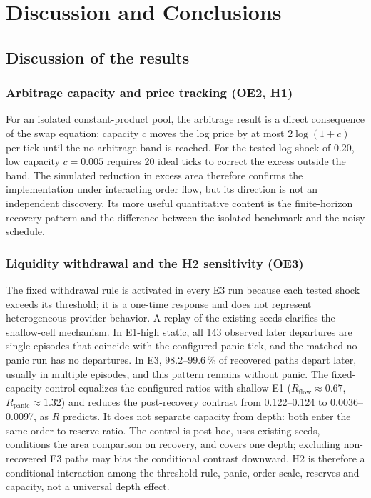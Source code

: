 \chapter{Discussion and Conclusions}
\label{cap:discusion}

\section{Discussion of the results}

\subsection{Arbitrage capacity and price tracking (OE2, H1)}

For an isolated constant-product pool, the arbitrage result is a direct consequence of the swap equation: capacity $c$ moves the log price by at most $2\log(1+c)$ per tick until the no-arbitrage band is reached. For the tested log shock of $0.20$, low capacity $c=0.005$ requires 20 ideal ticks to correct the excess outside the band. The simulated reduction in excess area therefore confirms the implementation under interacting order flow, but its direction is not an independent discovery. Its more useful quantitative content is the finite-horizon recovery pattern and the difference between the isolated benchmark and the noisy schedule.

\subsection{Liquidity withdrawal and the H2 sensitivity (OE3)}

The fixed withdrawal rule is activated in every E3 run because each tested shock exceeds its threshold; it is a one-time response and does not represent heterogeneous provider behavior. A replay of the existing seeds clarifies the shallow-cell mechanism. In E1-high static, all 143 observed later departures are single episodes that coincide with the configured panic tick, and the matched no-panic run has no departures. In E3, 98.2--99.6\,\% of recovered paths depart later, usually in multiple episodes, and this pattern remains without panic. The fixed-capacity control equalizes the configured ratios with shallow E1 ($R_{\mathrm{flow}}\approx0.67$, $R_{\mathrm{panic}}\approx1.32$) and reduces the post-recovery contrast from 0.122--0.124 to 0.0036--0.0097, as $R$ predicts. It does not separate capacity from depth: both enter the same order-to-reserve ratio. The control is post hoc, uses existing seeds, conditions the area comparison on recovery, and covers one depth; excluding non-recovered E3 paths may bias the conditional contrast downward. H2 is therefore a conditional interaction among the threshold rule, panic, order scale, reserves and capacity, not a universal depth effect.

